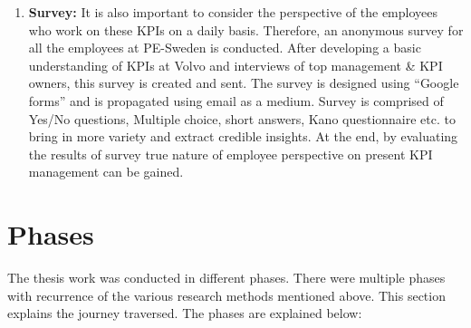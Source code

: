 \begin{enumerate}
    \item \textbf{Survey:}
    It is also important to consider the perspective of the employees who work on these KPIs on a daily basis. Therefore, an anonymous survey for all the employees at PE-Sweden is conducted. After developing a basic understanding of KPIs at Volvo and interviews of top management & KPI owners, this survey is created and sent. The survey is designed using “Google forms” and is propagated using email as a medium. Survey is comprised of Yes/No questions, Multiple choice, short answers, Kano questionnaire etc. to bring in more variety and extract credible insights. At the end, by evaluating the results of survey true nature of employee perspective on present KPI management can be gained.\\
\end{enumerate}
    
    
\section{Phases} 

The thesis work was conducted in different phases. There were multiple phases with recurrence of the various research methods mentioned above. This section explains the journey traversed. The phases are explained below:\\

